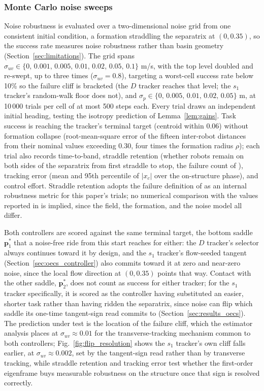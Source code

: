 \documentclass[lettersize,journal]{IEEEtran}
\begin{document}
\subsubsection{Monte Carlo noise sweeps}
Noise robustness is evaluated over a two-dimensional noise grid from
one consistent initial condition, a formation straddling the separatrix
at $(0, 0.35)$, so the success rate measures noise robustness rather
than basin geometry (Section~\ref{sec:limitations}). The grid spans $\sigma_{uv} \in \{0,\,
0.001,\, 0.005,\, 0.01,\, 0.02,\, 0.05,\, 0.1\}$ m/s, with the top
level doubled and re-swept, up to three times ($\sigma_{uv} = 0.8$),
targeting a worst-cell success rate below 10\% so the failure cliff is
bracketed (the $D$ tracker reaches that level; the $s_1$ tracker's
random-walk floor does not), and $\sigma_p \in
\{0,\, 0.005,\, 0.01,\, 0.02,\, 0.05\}$ m, at 10\,000 trials per cell of
at most 500 steps each. Every trial draws an independent initial
heading, testing the isotropy prediction of Lemma~\ref{lem:gains}.
Task success is reaching the tracker's terminal target (centroid
within 0.06) without formation collapse (root-mean-square error of the
fifteen inter-robot distances from their nominal values exceeding
0.30, four times the formation radius $\rho$); each trial also
records time-to-band, straddle retention (whether robots remain on
both sides of the separatrix from first straddle to stop, the failure
count of \cite{9}), tracking error (mean and 95th percentile of
$|x_c|$ over the on-structure phase), and control effort. Straddle
retention adopts the failure definition of \cite{9} as an internal
robustness metric for this paper's trials; no numerical comparison
with the values reported in \cite{9} is implied, since the field, the
formation, and the noise model all differ.

Both controllers are scored against the same terminal target, the
bottom saddle $\mathbf{p}^*_1$ that a noise-free ride from this start
reaches for either: the $D$ tracker's selector always continues toward
it by design, and the $s_1$ tracker's flow-seeded tangent
(Section~\ref{sec:oecs_controller}) also commits toward it at zero and
near-zero noise, since the local flow direction at $(0, 0.35)$ points
that way. Contact with the other saddle, $\mathbf{p}^*_2$, does not
count as success for either tracker; for the $s_1$ tracker specifically,
it is scored as the controller having substituted an easier, shorter
task rather than having ridden the separatrix, since noise can flip
which saddle its one-time tangent-sign read commits to
(Section~\ref{sec:results_oecs}). The prediction under test is the
location of the failure cliff, which the estimator analysis places at
$\sigma_{uv} \approx 0.01$ for the transverse-tracking mechanism common
to both controllers; Fig.~\ref{fig:flip_resolution} shows the $s_1$
tracker's own cliff falls earlier, at $\sigma_{uv} \approx 0.002$, set
by the tangent-sign read rather than by transverse tracking, while
straddle retention and tracking error test whether the first-order
eigenframe buys measurable robustness on the structure once that sign
is resolved correctly.
\end{document}
